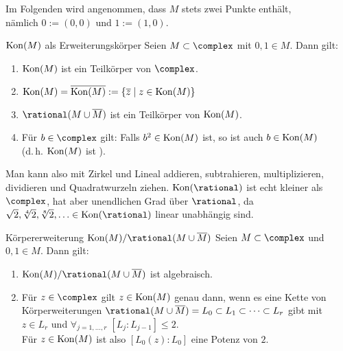 \linie
\pagebreak

\begin{Bem}
    Im Folgenden wird angenommen, dass $M$ stets zwei Punkte enthält,\\
    nämlich $0 := (0, 0)$ und $1 := (1, 0)$.
\end{Bem}

\begin{Theorem}{$\operatorname{Kon}(M)$ als Erweiterungskörper}
    Seien $M \subset \complex$ mit $0, 1 \in M$. Dann gilt:
    \begin{enumerate}[label=(\alph*)]
        \item
        $\operatorname{Kon}(M)$ ist ein Teilkörper von $\complex$.

        \item
        $\operatorname{Kon}(M) = \overline{\operatorname{Kon}(M)} := \{\overline{z} \;|\; z \in \operatorname{Kon}(M)\}$

        \item
        $\rational(M \cup \overline{M})$ ist ein Teilkörper von $\operatorname{Kon}(M)$.

        \item
        Für $b \in \complex$ gilt:
        Falls $b^2 \in \operatorname{Kon}(M)$ ist, so ist auch $b \in \operatorname{Kon}(M)$\\
        (d.\,h. $\operatorname{Kon}(M)$ ist ).
    \end{enumerate}
\end{Theorem}

\begin{Bem}
    Man kann also mit Zirkel und Lineal addieren, subtrahieren, multiplizieren,
    dividieren und Quadratwurzeln ziehen.
    $\Kon(\rational)$ ist echt kleiner als $\complex$, hat
    aber unendlichen Grad über $\rational$,
    da $\sqrt{2}, \sqrt[4]{2}, \sqrt[8]{2}, \dotsc \in \Kon(\rational)$
    linear unabhängig sind.
\end{Bem}

\linie

\begin{Theorem}{Körpererweiterung $\Kon(M)/\rational(M \cup \overline{M})$}
    Seien $M \subset \complex$ und $0, 1 \in M$. Dann gilt:
    \begin{enumerate}[label=(\alph*)]
        \item
        $\Kon(M)/\rational(M \cup \overline{M})$ ist algebraisch.

        \item
        Für $z \in \complex$ gilt $z \in \operatorname{Kon}(M)$ genau dann, wenn
        es eine Kette von Körperweiterungen
        $\rational(M \cup \overline{M}) = L_0 \subset L_1 \subset \dotsb
        \subset L_r$ gibt mit $z \in L_r$ und
        $\forall_{j=1,\dotsc,r}\; [L_j:L_{j-1}] \le 2$.\\
        Für $z \in \operatorname{Kon}(M)$ ist also
        $[L_0(z):L_0]$ eine Potenz von $2$.
    \end{enumerate}
\end{Theorem}

